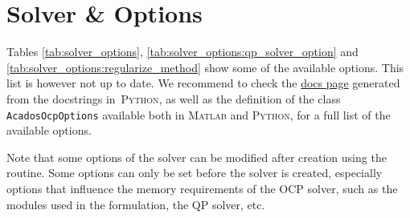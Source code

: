 \documentclass[english]{article}
\newcommand{\code}[1]{\texttt{#1}}
\newcommand{\matlab}{\textsc{Matlab}}
\newcommand{\python}{\textsc{Python}}
\begin{document}
\section{Solver \& Options}\label{sec:solver}


Tables \ref{tab:solver_options}, \ref{tab:solver_options:qp_solver_option} and \ref{tab:solver_options:regularize_method} show some of the available options.
This list is however not up to date.
We recommend to check the \href{https://docs.acados.org/python_interface/index.html#acados_template.acados_ocp_options.AcadosOcpOptions}{docs page} generated from the docstrings in~\python, as well as the definition of the class \code{AcadosOcpOptions} available both in \matlab{} and \python{}, for a full list of the available options.


Note that some options of the solver can be modified after creation using the routine.
Some options can only be set before the solver is created, especially options that influence the memory requirements of the OCP solver, such as the modules used in the formulation, the QP solver, etc.
\end{document}
